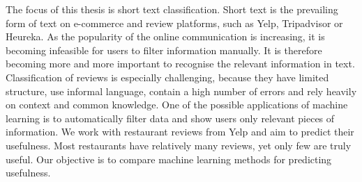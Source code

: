 \documentclass[12pt]{report}
\begin{document}

The focus of this thesis is short text classification. Short text is the prevailing form of text on e-commerce and review platforms, such as Yelp, Tripadvisor or Heureka. As the popularity of the online communication is increasing, it is becoming infeasible for users to filter information manually.  It is therefore becoming more and more important to recognise the relevant information in text. Classification of reviews is especially challenging, because they have limited structure, use informal language, contain a high number of errors and rely heavily on context and common knowledge. One of the possible applications of machine learning is to automatically filter data and show users only relevant pieces of information. We work with restaurant reviews from Yelp and aim to predict their usefulness. Most restaurants have relatively many reviews, yet only few are truly useful. Our objective is to compare machine learning methods for predicting usefulness.
\end{document}
